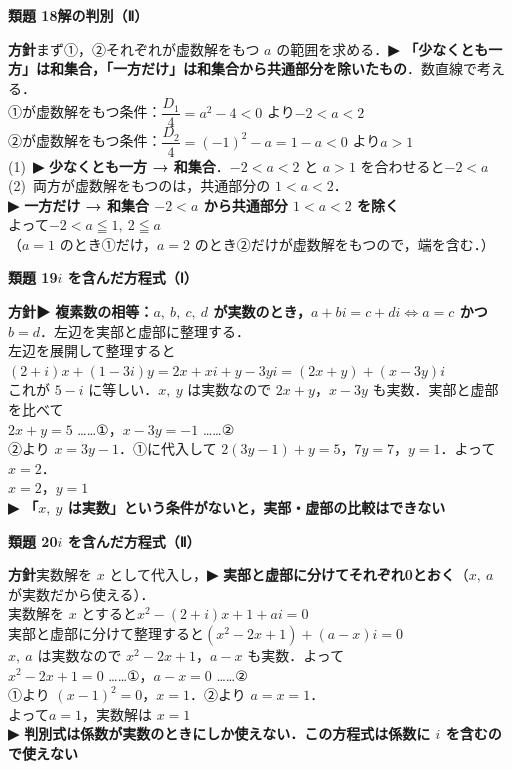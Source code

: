 \documentclass[a4paper,11pt]{ltjsarticle}
\newcommand{\ans}[2]{\Needspace{5\baselineskip}\vspace{6pt}%
  {\sffamily\bfseries 類題 #1\quad #2}\par}
\newcommand{\point}[1]{\textsf{\bfseries ▶ #1}}
\begin{document}
\ans{18}{解の判別（Ⅱ）}
\begin{kai}
\textbf{方針}\quad まず①，②それぞれが虚数解をもつ $a$ の範囲を求める．\point{「少なくとも一方」は和集合，「一方だけ」は和集合から共通部分を除いたもの}．数直線で考える．\\[2pt]
①が虚数解をもつ条件：$\dfrac{D_1}4=a^2-4<0$ より\quad $-2<a<2$\\
②が虚数解をもつ条件：$\dfrac{D_2}4=(-1)^2-a=1-a<0$ より\quad $a>1$\\[2pt]
(1)\ \point{少なくとも一方 → 和集合}．$-2<a<2$ と $a>1$ を合わせると\quad $-2<a$\\[2pt]
(2)\ 両方が虚数解をもつのは，共通部分の $1<a<2$．\\
\hspace*{1.5em}\point{一方だけ → 和集合 $-2<a$ から共通部分 $1<a<2$ を除く}\\
\hspace*{1.5em}よって\quad $-2<a\leqq1,\ 2\leqq a$\\
\hspace*{1.5em}（$a=1$ のとき①だけ，$a=2$ のとき②だけが虚数解をもつので，端を含む．）
\end{kai}

\ans{19}{$i$ を含んだ方程式（Ⅰ）}
\begin{kai}
\textbf{方針}\quad \point{複素数の相等：$a,\ b,\ c,\ d$ が実数のとき，$a+bi=c+di\iff a=c$ かつ $b=d$}．左辺を実部と虚部に整理する．\\[2pt]
左辺を展開して整理すると\\
\hspace*{1.5em}$(2+i)x+(1-3i)y=2x+xi+y-3yi=(2x+y)+(x-3y)i$\\
これが $5-i$ に等しい．$x,\ y$ は実数なので $2x+y$，$x-3y$ も実数．実部と虚部を比べて\\
\hspace*{1.5em}$2x+y=5$ ……①，\quad $x-3y=-1$ ……②\\
②より $x=3y-1$．①に代入して $2(3y-1)+y=5$，$7y=7$，$y=1$．よって $x=2$．\\
\hspace*{1.5em}$x=2$，\quad $y=1$\\
\point{「$x,\ y$ は実数」という条件がないと，実部・虚部の比較はできない}
\end{kai}

\ans{20}{$i$ を含んだ方程式（Ⅱ）}
\begin{kai}
\textbf{方針}\quad 実数解を $x$ として代入し，\point{実部と虚部に分けてそれぞれ0とおく}（$x,\ a$ が実数だから使える）．\\[2pt]
実数解を $x$ とすると\quad $x^2-(2+i)x+1+ai=0$\\
実部と虚部に分けて整理すると\quad $(x^2-2x+1)+(a-x)i=0$\\
$x,\ a$ は実数なので $x^2-2x+1$，$a-x$ も実数．よって\\
\hspace*{1.5em}$x^2-2x+1=0$ ……①，\quad $a-x=0$ ……②\\
①より $(x-1)^2=0$，$x=1$．②より $a=x=1$．\\[2pt]
よって\quad $a=1$，実数解は $x=1$\\
\point{判別式は係数が実数のときにしか使えない．この方程式は係数に $i$ を含むので使えない}
\end{kai}
\end{document}
